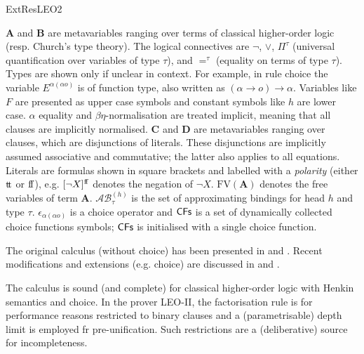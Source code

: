 \begin{entry}{ExtResLEO2}
 \begin{clarifications}
 $\mathbf{A}$ and $\mathbf{B}$ are metavariables ranging over terms of classical higher-order logic (resp. Church's type theory). The logical connectives are $\neg$, $\vee$, $\Pi^\tau$ (universal quantification over variables of type $\tau$), and $=^\tau$ (equality on terms of type $\tau$). Types are shown only if unclear in context. For example, in  rule choice the variable $E^{\alpha (\alpha o)}$ is of function type, also written as ${(\alpha \rightarrow o) \rightarrow \alpha}$. Variables like $F$ are presented as upper case symbols and constant symbols like $h$  are lower case. $\alpha$ equality and $\beta\eta$-normalisation are treated implicit, meaning that all clauses are implicitly normalised. $\mathbf{C}$ and $\mathbf{D}$ are metavariables ranging over clauses, which are disjunctions of literals. These disjunctions are implicitly assumed associative and commutative; the latter also applies to all equations. Literals are formulas shown in square brackets and labelled with a \emph{polarity} (either ${\mathrm{t}\!\mathrm{t}}$ or ${\mathrm{f}\!\mathrm{f}}$), e.g. $[\neg X]^{\mathrm{f}\!\mathrm{f}}$ denotes the negation of $\neg X$.  $\mathrm{FV}(\mathbf{A})$ denotes the free variables of term $\mathbf{A}$. $\mathcal{AB}^{(h)}_\tau$ is the set of approximating bindings for head $h$ and type $\tau$. $\epsilon_{\alpha (\alpha o)}$ is a choice operator and $\textsf{CFs}$ is a set of dynamically collected choice functions symbols; $\textsf{CFs}$ is initialised with a single choice function.
\end{clarifications}


 \begin{history}
The original calculus (without choice) has been presented in \cite{C5} and \cite{J5}. Recent modifications and extensions (e.g. choice) are discussed in  \cite{W47} and \cite{EasyChair:215}.
 \end{history}

\begin{technicalities} 
The calculus is sound (and complete) for classical higher-order logic with Henkin semantics and choice. In the prover LEO-II, the factorisation rule is for performance reasons restricted to binary clauses and a (parametrisable) depth limit is employed fr pre-unification. Such restrictions are a (deliberative) source for incompleteness.
 \end{technicalities}



\end{entry}
